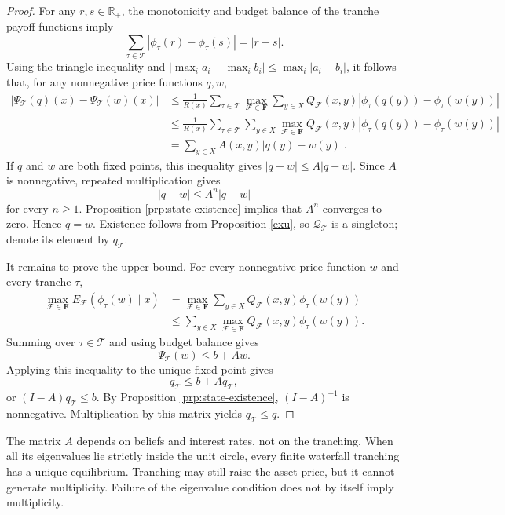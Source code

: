 \documentclass[11pt]{article}
\theoremstyle{plain}
\begin{document}
\begin{proof}
For any $r,s\in\mathbb{R}_+$, the monotonicity and budget balance of the tranche payoff functions imply
\[
\sum_{\tau\in\mathcal{T}}
\left|\phi_\tau(r)-\phi_\tau(s)\right|
=|r-s|.
\]
Using the triangle inequality and $|\max_i a_i-\max_i b_i|\leq\max_i|a_i-b_i|$, it follows that, for any nonnegative price functions $q,w$,
\begin{align*}
\left|\Psi_{\mathcal{T}}(q)(x)-\Psi_{\mathcal{T}}(w)(x)\right|
&\leq
\frac{1}{R(x)}
\sum_{\tau\in\mathcal{T}}
\max_{\mathcal{F}\in\mathbf{F}}
\sum_{y\in X}Q_\mathcal{F}(x,y)
\left|\phi_\tau(q(y))-\phi_\tau(w(y))\right|\\
&\leq
\frac{1}{R(x)}
\sum_{\tau\in\mathcal{T}}
\sum_{y\in X}
\max_{\mathcal{F}\in\mathbf{F}}Q_\mathcal{F}(x,y)
\left|\phi_\tau(q(y))-\phi_\tau(w(y))\right|\\
&=
\sum_{y\in X}A(x,y)|q(y)-w(y)|.
\end{align*}
If $q$ and $w$ are both fixed points, this inequality gives $|q-w|\leq A|q-w|$. Since $A$ is nonnegative, repeated multiplication gives
\[
|q-w|\leq A^n|q-w|
\]
for every $n\geq1$. Proposition \ref{prp:state-existence} implies that $A^n$ converges to zero. Hence $q=w$. Existence follows from Proposition \ref{exu}, so $\mathcal{Q}_{\mathcal{T}}$ is a singleton; denote its element by $q_{\mathcal{T}}$.

It remains to prove the upper bound. For every nonnegative price function $w$ and every tranche $\tau$,
\begin{align*}
\max_{\mathcal{F}\in\mathbf{F}}
E_{\mathcal{F}}\left(\phi_\tau(w)\mid x\right)
&=
\max_{\mathcal{F}\in\mathbf{F}}
\sum_{y\in X}Q_\mathcal{F}(x,y)\phi_\tau(w(y))\\
&\leq
\sum_{y\in X}
\max_{\mathcal{F}\in\mathbf{F}}Q_\mathcal{F}(x,y)
\phi_\tau(w(y)).
\end{align*}
Summing over $\tau\in\mathcal{T}$ and using budget balance gives
\[
\Psi_{\mathcal{T}}(w)\leq b+Aw.
\]
Applying this inequality to the unique fixed point gives
\[
q_{\mathcal{T}}\leq b+Aq_{\mathcal{T}},
\]
or $(I-A)q_{\mathcal{T}}\leq b$. By Proposition \ref{prp:state-existence}, $(I-A)^{-1}$ is nonnegative. Multiplication by this matrix yields $q_{\mathcal{T}}\leq\bar q$.
\end{proof}

The matrix $A$ depends on beliefs and interest rates, not on the tranching. When all its eigenvalues lie strictly inside the unit circle, every finite waterfall tranching has a unique equilibrium. Tranching may still raise the asset price, but it cannot generate multiplicity. Failure of the eigenvalue condition does not by itself imply multiplicity.
\end{document}

